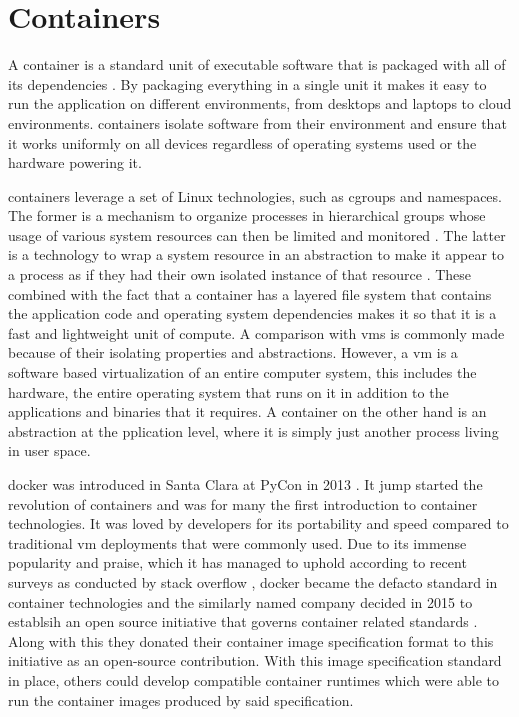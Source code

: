 \section{Containers}
\label{sec:bg-containers}


A \gls{container} is a standard unit of executable software that is packaged with all of its dependencies \cite{docker-what-is-container, ibm-what-is-container}. By packaging everything in a single unit it makes it easy to run the application on different environments, from desktops and laptops to cloud environments. \Glspl{container} isolate software from their environment and ensure that it works uniformly on all devices regardless of operating systems used or the hardware powering it. 




\Glspl{container} leverage a set of Linux technologies, such as cgroups and namespaces. The former is a mechanism to organize processes in hierarchical groups whose usage of various system resources can then be limited and monitored \cite{cgroups, man-cgroups}. The latter is a technology to wrap a system resource in an abstraction to make it appear to a process as if they had their own isolated instance of that resource \cite{man-namespaces}. These combined with the fact that a container has a layered file system that contains the application code and operating system dependencies makes it so that it is a fast and lightweight unit of compute. A comparison with \glspl{vm} is commonly made because of their isolating properties and abstractions. However, a \gls{vm} is a software based virtualization of an entire computer system, this includes the hardware, the entire operating system that runs on it in addition to the applications and binaries that it requires. A \gls{container} on the other hand is an abstraction at the pplication level, where it is simply just another process living in user space.


\Gls{docker} was introduced in Santa Clara at PyCon in 2013 \cite{pycon2013} . It jump started the revolution of \glspl{container} and was for many the first introduction to \gls{container} technologies. It was loved by developers for its portability and speed compared to traditional \gls{vm} deployments that were commonly used. Due to its immense popularity and praise, which it has managed to uphold according to recent surveys as conducted by stack overflow \cite{stack-overflow-survey}, \gls{docker} became the defacto standard in \gls{container} technologies and the similarly named company decided in 2015 to establsih an open source initiative that governs \gls{container} related standards \cite{open-container-standard}. Along with this they donated their container image specification format \cite{open-container-standard-image-spec} to this initiative as an open-source contribution. With this image specification standard in place, others could develop compatible container runtimes which were able to run the container images produced by said specification.
